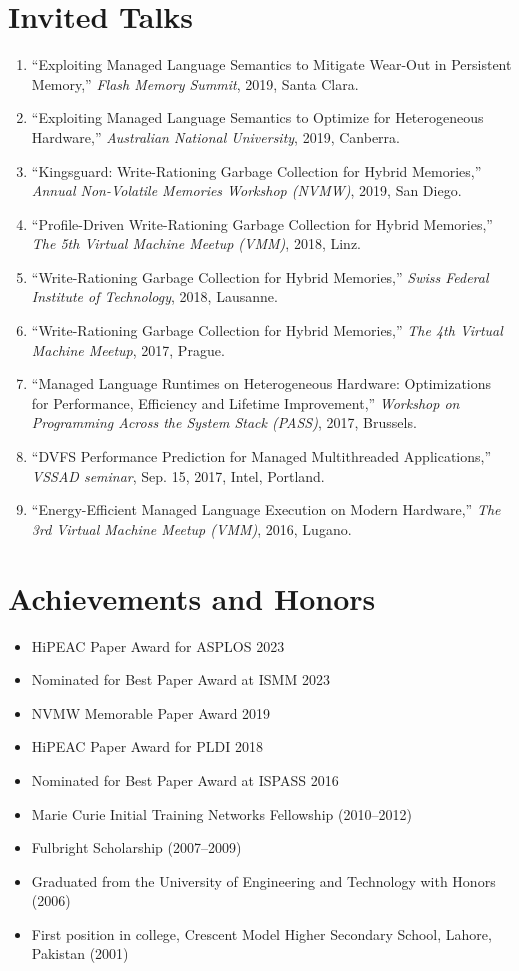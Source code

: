 \documentclass[11pt,a4paper,sans]{moderncv}
\begin{document}
\section{Invited Talks}
{\small
\begin{enumerate}
\item ``Exploiting Managed Language Semantics to Mitigate Wear-Out in Persistent Memory,'' \emph{Flash Memory Summit}, 2019, Santa Clara.
\item ``Exploiting Managed Language Semantics to Optimize for Heterogeneous Hardware,'' \emph{Australian National University}, 2019, Canberra.
\item ``Kingsguard: Write-Rationing Garbage Collection for Hybrid Memories,'' \emph{Annual Non-Volatile Memories Workshop (NVMW)}, 2019, San Diego.
\item ``Profile-Driven Write-Rationing Garbage Collection for Hybrid Memories,'' \emph{The 5th Virtual Machine Meetup (VMM)}, 2018, Linz.
\item ``Write-Rationing Garbage Collection for Hybrid Memories,'' \emph{Swiss Federal Institute of Technology}, 2018, Lausanne.
\item ``Write-Rationing Garbage Collection for Hybrid Memories,'' \emph{The 4th Virtual Machine Meetup}, 2017, Prague.
\item ``Managed Language Runtimes on Heterogeneous Hardware: Optimizations for Performance, Efficiency and Lifetime Improvement,'' \emph{Workshop on Programming Across the System Stack (PASS)}, 2017, Brussels.
\item ``DVFS Performance Prediction for Managed Multithreaded Applications,'' \emph{VSSAD seminar}, Sep. 15, 2017, Intel, Portland.
\item ``Energy-Efficient Managed Language Execution on Modern Hardware,'' \emph{The 3rd Virtual Machine Meetup (VMM)}, 2016, Lugano.
\end{enumerate}
}

\section{Achievements and Honors}
\begin{itemize}
\item HiPEAC Paper Award for ASPLOS 2023
\item Nominated for Best Paper Award at ISMM 2023
\item NVMW Memorable Paper Award 2019
\item HiPEAC Paper Award for PLDI 2018 
\item Nominated for Best Paper Award at ISPASS 2016 
\item Marie Curie Initial Training Networks Fellowship (2010--2012)
\item Fulbright Scholarship (2007--2009)
\item Graduated from the University of Engineering and Technology with Honors (2006)
\item First position in college, Crescent Model Higher Secondary School, Lahore, Pakistan (2001)
\end{itemize}
\end{document}
